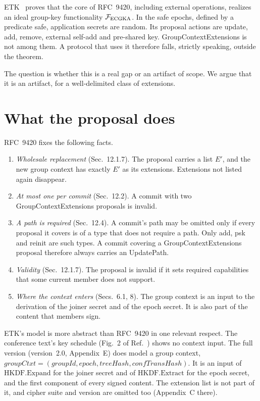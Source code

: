\documentclass[aps,prx,reprint,superscriptaddress,nofootinbib,floatfix]{revtex4-2}
\theoremstyle{remark}
\newcommand{\F}{\mathcal F_{\rm ECGKA}}
\begin{document}
ETK~\cite{etk} proves that the core of RFC~9420, including external operations, realizes an ideal group-key functionality $\F$. In the safe epochs, defined by a predicate \textsf{safe}, application secrets are random. Its proposal actions are update, add, remove, external self-add and pre-shared key. GroupContextExtensions is not among them. A protocol that uses it therefore falls, strictly speaking, outside the theorem.

The question is whether this is a real gap or an artifact of scope. We argue that it is an artifact, for a well-delimited class of extensions.

\section{What the proposal does}

RFC~9420 fixes the following facts.
\begin{enumerate}
\item \emph{Wholesale replacement} (Sec.~12.1.7). The proposal carries a list $E'$, and the new group context has exactly $E'$ as its extensions. Extensions not listed again disappear.
\item \emph{At most one per commit} (Sec.~12.2). A commit with two GroupContextExtensions proposals is invalid.
\item \emph{A path is required} (Sec.~12.4). A commit's path may be omitted only if every proposal it covers is of a type that does not require a path. Only add, psk and reinit are such types. A commit covering a GroupContextExtensions proposal therefore always carries an UpdatePath.
\item \emph{Validity} (Sec.~12.1.7). The proposal is invalid if it sets required capabilities that some current member does not support.
\item \emph{Where the context enters} (Secs.~6.1, 8). The group context is an input to the derivation of the joiner secret and of the epoch secret. It is also part of the content that members sign.
\end{enumerate}

ETK's model is more abstract than RFC~9420 in one relevant respect. The conference text's key schedule (Fig.~2 of Ref.~\cite{etk}) shows no context input. The full version (version~2.0, Appendix~E) does model a group context, $\mathit{groupCtxt}=(\mathit{groupId},\mathit{epoch},\mathit{treeHash},\mathit{confTransHash})$. It is an input of $\mathrm{HKDF.Expand}$ for the joiner secret and of $\mathrm{HKDF.Extract}$ for the epoch secret, and the first component of every signed content. The extension list is not part of it, and cipher suite and version are omitted too (Appendix~C there).
\end{document}
